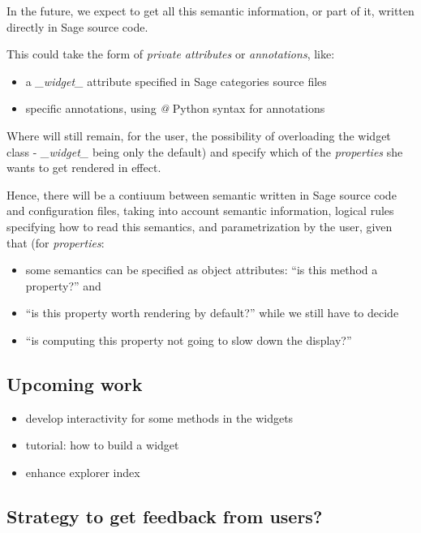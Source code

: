 \documentclass{deliverablereport}
\begin{document}
In the future, we expect to get all this semantic information, or part of it,
written directly in Sage source code.

This could take the form of \emph{private attributes} or \emph{annotations}, like:

\begin{itemize}
\item a \emph{\_widget\_} attribute specified in Sage categories source files
\item specific annotations, using \emph{@} Python syntax for annotations
  \end{itemize}

Where will still remain, for the user, the possibility of overloading
the widget class - \emph{\_widget\_} being only the default) and
specify which of the \emph{properties} she wants to get rendered in effect.

Hence, there will be a contiuum between semantic written in Sage
source code and configuration files, taking into account semantic
information, logical rules specifying how to read this semantics, and
parametrization by the user, given that (for \emph{properties}:

\begin{itemize}
\item some semantics can be specified as object attributes: ``is this method a
  property?'' and
  \item ``is this property worth rendering by default?''  while we
    still have to decide
  \item ``is computing this property not going to slow down the display?''
\end{itemize}

\subsection{Upcoming work}

\begin{itemize}
\item develop interactivity for some methods in the widgets
\item tutorial: how to build a widget
\item enhance explorer index
\end{itemize}

\subsection{Strategy to get feedback from users?}


\appendix

\end{document}
